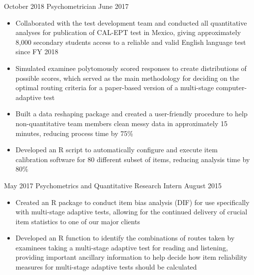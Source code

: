\begin{experiences}
{\begin{itemize}
      \end{itemize}
                    }
    \emptySeparator                
    
   	\experienceADD
    {October 2018}
    {Psychometrician}
    {June 2017} {

      \begin{itemize}

          \item Collaborated with the test development team and conducted all quantitative analyses for publication of CAL-EPT test in Mexico, giving approximately 8,000 secondary students access to a reliable and valid English language test since FY 2018
          
          \item Simulated examinee polytomously scored responses to create distributions of possible scores, which served as the main methodology for deciding on the optimal routing criteria for a paper-based version of a multi-stage computer-adaptive test 
          
          \item Built a data reshaping package and created a user-friendly procedure to help non-quantitative team members clean messy data in approximately 15 minutes, reducing process time by 75\%
          
          \item Developed an R script to automatically configure and execute item calibration software for 80 different subset of items, reducing analysis time by 80\%
          
      \end{itemize}
      

                    }
    \emptySeparator                
                    
    \experienceADD
    {May 2017}
    {Psychometrics and Quantitative Research Intern}
    {August 2015} {
      \begin{itemize}
            \item Created an R package to conduct item bias analysis (DIF) for use specifically with multi-stage adaptive tests, allowing for the continued delivery of crucial item statistics to one of our major clients
            
           \item Developed an R function to identify the combinations of routes taken by examinees taking a multi-stage adaptive test for reading and listening, providing important ancillary information to help decide how item reliability measures for multi-stage adaptive tests should be calculated


\end{itemize}}
\end{experiences}

